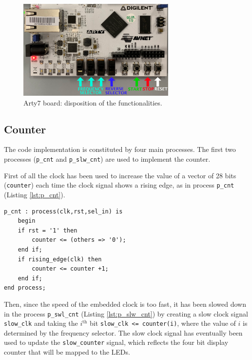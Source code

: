 \documentclass[11pt, a4paper]{article}
\begin{document}
\begin{figure}[H]
\centering
\includegraphics[width=0.7\textwidth]{../main/image/board_implementation.pdf}
\caption{\label{fig:board_implementation} Arty7 board: disposition of the functionalities.}
\end{figure}


\clearpage
\subsection{Counter}
The code implementation is constituted by four main processes. The first two processes ({\footnotesize\texttt{p\_cnt}} and {\footnotesize\texttt{p\_slw\_cnt}}) are used to implement the counter.

First of all the clock has been used to increase the value of a vector of 28 bits ({\footnotesize\texttt{counter}}) each time the clock signal shows a rising edge, as in process {\footnotesize\texttt{p\_cnt}} (Listing \ref{lst:p_cnt}).

\begin{lstlisting}[style=vhdl,label={lst:p_cnt},caption={\footnotesize\texttt{p\_cnt} process.}]
p_cnt : process(clk,rst,sel_in) is
    begin
    if rst = '1' then
        counter <= (others => '0');
    end if;
    if rising_edge(clk) then
        counter <= counter +1;
    end if;
end process;\end{lstlisting}

Then, since the speed of the embedded clock is too fast, it has been slowed down in the process {\footnotesize\texttt{p\_swl\_cnt}} (Listing \ref{lst:p_slw_cnt}) by creating a slow clock signal {\footnotesize\texttt{slow\_clk}} and taking the \(i^\text{th}\) bit {\footnotesize\texttt{slow\_clk <= counter(i)}}, where the value of \(i\) is determined by the frequency selector.
The slow clock signal has eventually been used to update the {\footnotesize\texttt{slow\_counter}} signal, which reflects the four bit display counter that will be mapped to the LEDs.
\end{document}
